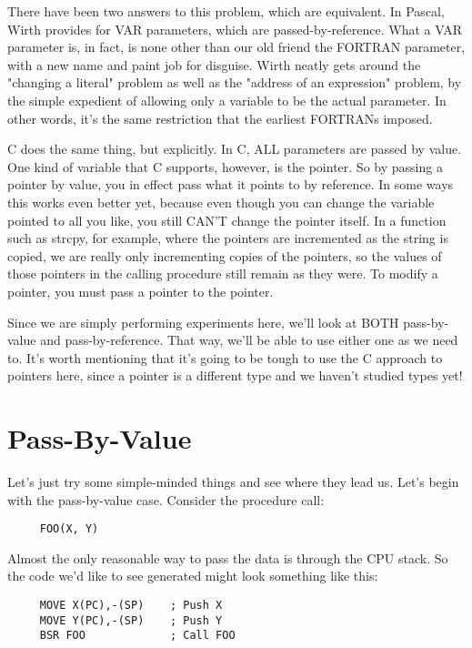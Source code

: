 There  have  been   two   answers  to  this  problem, which  are equivalent. In Pascal, Wirth provides for VAR parameters, which are  passed-by-reference. What a VAR parameter is, in fact, is none other than our old friend the FORTRAN parameter, with  a new name and paint job for disguise. Wirth neatly  gets  around  the "changing a literal"  problem  as  well  as  the  "address  of an expression" problem, by  the  simple expedient of allowing only a variable to be the actual parameter. In other  words, it's  the same restriction that the earliest FORTRANs imposed.

C does the same thing, but explicitly. In  C,  ALL   parameters are passed  by  value. One  kind  of variable that C supports, however, is the pointer. So  by  passing a pointer by value, you in effect pass what it points to by reference. In some ways this works even better yet, because  even  though  you can change the variable  pointed to all you like, you  still  CAN'T  change  the pointer itself. In a function such as strcpy, for example, where the  pointers are incremented as the string  is  copied, we  are really only incrementing copies of the pointers, so the values of those  pointers in the calling procedure  still  remain  as  they were. To modify a  pointer, you  must  pass  a  pointer  to the pointer.

Since we are simply  performing  experiments  here, we'll look at BOTH pass-by-value and pass-by-reference. That  way, we'll be able to use either one as we need to. It's worth mentioning that it's  going  to  be tough to use the C approach to pointers here, since a pointer is a different type and we haven't  studied types yet!

\section{Pass-By-Value}

Let's just try some simple-minded  things and see where they lead us. Let's begin with the pass-by-value  case. Consider  the procedure call:

\begin{verbatim}
     FOO(X, Y)
\end{verbatim}

Almost the only reasonable way to pass the data  is  through  the CPU stack. So the code we'd like  to  see  generated  might look something like this:

\begin{verbatim}
     MOVE X(PC),-(SP)    ; Push X
     MOVE Y(PC),-(SP)    ; Push Y
     BSR FOO             ; Call FOO
\end{verbatim}

